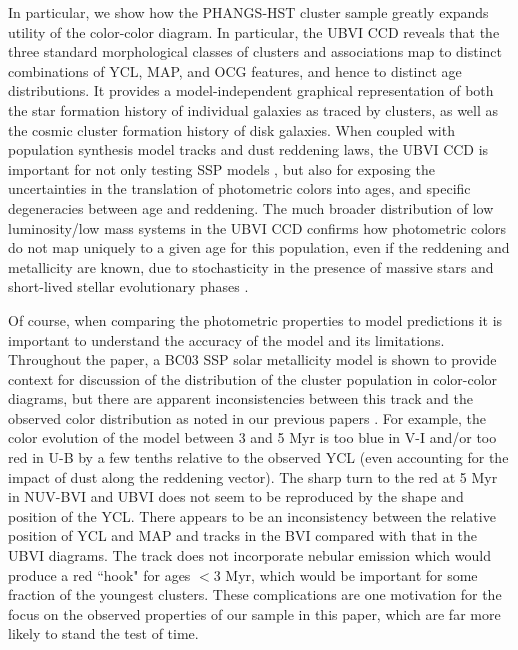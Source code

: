 \documentclass[linenumbers]{aastex63}
\begin{document}
In particular, {we show how the PHANGS-HST cluster sample greatly expands utility of the color-color diagram.  In particular,} the UBVI CCD reveals that the three standard morphological classes of clusters and associations map to distinct combinations of YCL, MAP, and OCG features, and hence to distinct age distributions.  It provides a model-independent graphical representation of {both the star formation history of individual galaxies as traced by clusters, as well as the cosmic cluster formation history of disk galaxies}.  When coupled with population synthesis model tracks and dust reddening laws, the UBVI CCD is important for {not only testing SSP models {\citep[e.g.,][]{larsen_young_1999, bruzual_stellar_2003, vazquez_optimization_2005, maraston_evolutionary_1998}}, but also for exposing the uncertainties in the translation of photometric colors into ages, and specific degeneracies between age and reddening.}   The much broader distribution of low luminosity/low mass systems in the UBVI CCD {confirms} how photometric colors do not map uniquely to a given age for this population, even if the reddening and metallicity are known, {due to stochasticity in the presence of massive stars and short-lived stellar evolutionary phases \citep[e.g.][]{fouesneau_accounting_2010, silva-villa_star_2011,de_meulenaer_deriving_2013,krumholz_star_2015, OD2022}.}

{ Of course, when comparing the photometric properties to model predictions it is important to understand the accuracy of the model and its limitations. Throughout the paper, a BC03 SSP solar metallicity model is shown to provide context for discussion of the distribution of the cluster population in color-color diagrams, but there are apparent inconsistencies between this track and the observed color distribution as noted in our previous papers \citep[e.g.,][]{turner_phangs-hst_2021, deger_bright_2022}.  For example, the color evolution of the model between 3 and 5 Myr is too blue in V-I and/or too red in U-B by a few tenths relative to the observed YCL (even accounting for the impact of dust along the reddening vector).  The sharp turn to the red at 5 Myr in NUV-BVI and UBVI does not seem to be reproduced by the shape and position of the YCL.   There appears to be an inconsistency between the relative position of YCL and MAP and tracks in the BVI compared with that in the UBVI diagrams.  The track does not incorporate nebular emission which would produce a red ``hook" for ages $<$3 Myr, which would be important for some fraction of the youngest clusters.  These complications are one motivation for the focus on the observed properties of our sample in this paper, which are far more likely to stand the test of time.}
\end{document}
